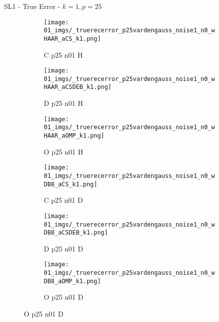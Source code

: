 \begin{frame}{SL1 - True Error - $k=1,p=25$}{}
\begin{figure}
\begin{subfigure}{0.13\textwidth}
\texttt{[image: 01\_imgs/\_truerecerror\_p25vardengauss\_noise1\_n0\_wHAAR\_aCS\_k1.png]}
\caption*{\tiny C p25 n01 H}
\end{subfigure}
\begin{subfigure}{0.13\textwidth}
\texttt{[image: 01\_imgs/\_truerecerror\_p25vardengauss\_noise1\_n0\_wHAAR\_aCSDEB\_k1.png]}
\caption*{\tiny D p25 n01 H}
\end{subfigure}
\begin{subfigure}{0.13\textwidth}
\texttt{[image: 01\_imgs/\_truerecerror\_p25vardengauss\_noise1\_n0\_wHAAR\_aOMP\_k1.png]}
\caption*{\tiny O p25 n01 H}
\end{subfigure}
\begin{subfigure}{0.13\textwidth}
\texttt{[image: 01\_imgs/\_truerecerror\_p25vardengauss\_noise1\_n0\_wDB8\_aCS\_k1.png]}
\caption*{\tiny C p25 n01 D}
\end{subfigure}
\begin{subfigure}{0.13\textwidth}
\texttt{[image: 01\_imgs/\_truerecerror\_p25vardengauss\_noise1\_n0\_wDB8\_aCSDEB\_k1.png]}
\caption*{\tiny D p25 n01 D}
\end{subfigure}
\begin{subfigure}{0.13\textwidth}
\texttt{[image: 01\_imgs/\_truerecerror\_p25vardengauss\_noise1\_n0\_wDB8\_aOMP\_k1.png]}
\caption*{\tiny O p25 n01 D}
\end{subfigure}

\vspace{5pt}


\end{figure}
\end{frame}
